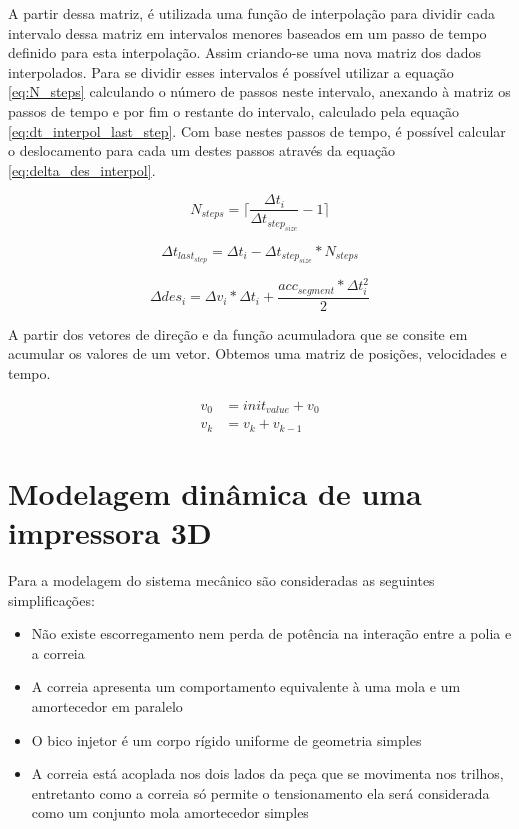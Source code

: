 A partir dessa matriz, é utilizada uma função de interpolação para dividir cada intervalo dessa matriz em intervalos menores
baseados em um passo de tempo definido para esta interpolação.
Assim criando-se uma nova matriz dos dados interpolados.
Para se dividir esses intervalos é possível utilizar a equação \ref{eq:N_steps}
calculando o número de passos neste intervalo, anexando à matriz os passos de tempo e por fim
o restante do intervalo, calculado pela equação \ref{eq:dt_interpol_last_step}.
Com base nestes passos de tempo, é possível calcular o deslocamento para cada um destes passos
através da equação \ref{eq:delta_des_interpol}.

\begin{equation}
    \label{eq:N_steps}
    N_{steps} = \lceil\frac{\Delta t_i}{\Delta t_{step_{size}}}-1\rceil
\end{equation}

\begin{equation}
    \label{eq:dt_interpol_last_step}
    \Delta t_{last_{step}}= \Delta t_i - \Delta t_{step_{size}}*N_{steps} 
\end{equation}

\begin{equation}
    \label{eq:delta_des_interpol}
    \Delta des_i = \Delta v_i*\Delta t_i+ \frac{acc_{segment}*\Delta t_i^2}{2} 
\end{equation}

A partir dos vetores de direção e da função acumuladora que se consite em acumular os valores de um vetor.
Obtemos uma matriz de posições, velocidades e tempo.

\begin{equation}
    \label{eq:acumulator_function}
    \begin{split}
        v_{0} &= init_{value} + v_{0} \\
        v_k &= v_k+v_{k-1}
    \end{split}
\end{equation}

\section{Modelagem dinâmica de uma impressora 3D}
Para a modelagem do sistema mecânico são consideradas as seguintes simplificações:
\begin{itemize}
    \item Não existe escorregamento nem perda de potência na interação entre a polia e a correia
    \item A correia apresenta um comportamento equivalente à uma mola e um amortecedor em paralelo
    \item O bico injetor é um corpo rígido uniforme de geometria simples
    \item A correia está acoplada nos dois lados da peça que se movimenta nos trilhos, entretanto como a correia só permite o tensionamento ela será considerada como um conjunto mola amortecedor simples
\end{itemize}

